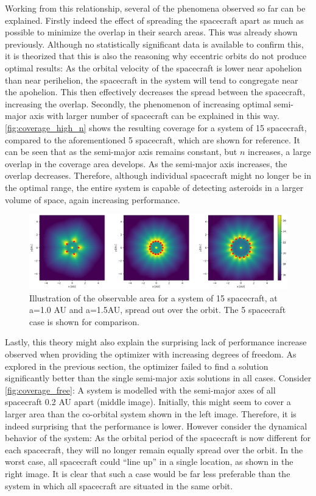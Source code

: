 Working from this relationship, several of the phenomena observed so far can be explained. Firstly indeed the effect of spreading the spacecraft apart as much as possible to minimize the overlap in their search areas. This was already shown previously. Although no statistically significant data is available to confirm this, it is theorized that this is also the reasoning why eccentric orbits do not produce optimal results: As the orbital velocity of the spacecraft is lower near apohelion than near perihelion, the spacecraft in the system will tend to congregate near the apohelion. This then effectively decreases the spread between the spacecraft, increasing the overlap. Secondly, the phenomenon of increasing optimal semi-major axis with larger number of spacecraft can be explained in this way. \autoref{fig:coverage_high_n} shows the resulting coverage for a system of 15 spacecraft, compared to the aforementioned 5 spacecraft, which are shown for reference. It can be seen that as the semi-major axis remains constant, but $n$ increases, a large overlap in the coverage area develops. As the semi-major axis increases, the overlap decreases. Therefore, although individual spacecraft might no longer be in the optimal range, the entire system is capable of detecting asteroids in a larger volume of space, again increasing performance. \\

\begin{figure}[htbp]
 \centering
 \includegraphics[width=1.0\textwidth]{img/coverage_high_n.png}
 \caption{Illustration of the observable area for a system of 15 spacecraft, at a=1.0 AU and a=1.5AU, spread out over the orbit. The 5 spacecraft case is shown for comparison.}
 \label{fig:coverage_high_n}
\end{figure}

Lastly, this theory might also explain the surprising lack of performance increase observed when providing the optimizer with increasing degrees of freedom. As explored in the previous section, the optimizer failed to find a solution significantly better than the single semi-major axis solutions in all cases. Consider \autoref{fig:coverage_free}: A system is modelled with the semi-major axes of all spacecraft 0.2 AU apart (middle image). Initially, this might seem to cover a larger area than the co-orbital system shown in the left image. Therefore, it is indeed surprising that the performance is lower. However consider the dynamical behavior of the system: As the orbital period of the spacecraft is now different for each spacecraft, they will no longer remain equally spread over the orbit. In the worst case, all spacecraft could ``line up'' in a single location, as shown in the right image. It is clear that such a case would be far less preferable than the system in which all spacecraft are situated in the same orbit.\\

